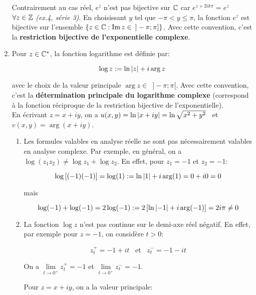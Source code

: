 \begin{example}
\begin{enumerate}[label=\arabic{enumi})]
    \begin{remark}
    Contrairement au cas réel, $e^z$ n'est pas bijective sur $\mathbb{C}$ car $e^{z + 2ik\pi} = e^z$ $\forall z \in \mathbb{Z}$ \textit{(ex.4, série 3)}.
    En choisissant $y$ tel que $-\pi < y \leq \pi$, la fonction $e^z$ est bijective sur l'ensemble $\left\{z \in \mathbb{C} : \operatorname{Im} z \in \enspace ] -\pi; \pi]\right\}$.
    Avec cette convention, c'est la \textbf{\og restriction bijective de l'exponentielle complexe\fg{}}.
    \end{remark}

    \item 
    Pour $z \in \mathbb{C}^*$, la fonction logarithme est définie par:
    
    \[
    \log z := \ln \left|z\right| + i \arg z
    \]
    
    avec le choix de la valeur principale $\arg z \in \enspace ]-\pi;\pi[$. Avec cette convention, c'est la \textbf{\og détermination principale du logarithme complexe \fg} (correspond à la fonction réciproque de la restriction bijective de l'exponentielle).\\
    En écrivant $z = x + iy$, on a $u(x,y) = \ln \left|x + iy\right| = \ln \sqrt{x^2 + y^2} \enspace$ et $v(x,y)= \arg (x + iy)$.
    
    \begin{remark}\hfill
    \begin{enumerate}[label=\alph*)]
    \item 
    Les formules valables en analyse réelle ne sont pas nécessairement valables en analyse complexe.
    Par exemple, en général, on a $\log(z_1 z_2) \neq \log z_1 + \log z_2$.
    En effet, pour $z_1 = -1$ et $z_2 = -1$:
    
    \[\log\left[(-1)(-1)\right] = \log(1) := \ln \left|1\right| + i \arg(1) = 0 + i0 = 0\]
    
    mais
    
    \[\log(-1) + \log(-1) = 2 \log(-1) := 2 \left[\ln \left|-1\right| + i \arg (-1) \right] = 2i\pi \neq 0 \]
    
    \item 
    La fonction $\log z$ n'est pas continue sur le demi-axe réel négatif.
    En effet, par exemple pour $z = -1$, on considère $t > 0$:
    
    \[z^+_t = -1 + it \enspace \textrm{ et }\enspace
     z^-_t = -1 - it \]
     
    On a $\lim\limits_{t \rightarrow 0^+} z^+_t = -1$ et $\lim\limits_{t \rightarrow 0^+} z^-_t = -1$.

    \begin{note}
    Pour $z = x + iy$, on a la valeur principale:
    

\end{note}
\end{enumerate}
\end{remark}
\end{enumerate}
\end{example}

